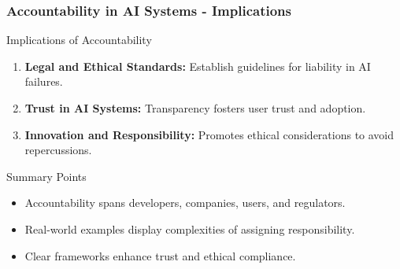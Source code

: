 \documentclass[aspectratio=169]{beamer}
\begin{document}
\begin{frame}[fragile]
    \frametitle{Accountability in AI Systems - Implications}
    \begin{block}{Implications of Accountability}
        \begin{enumerate}
            \item \textbf{Legal and Ethical Standards:} Establish guidelines for liability in AI failures.
            \item \textbf{Trust in AI Systems:} Transparency fosters user trust and adoption.
            \item \textbf{Innovation and Responsibility:} Promotes ethical considerations to avoid repercussions.
        \end{enumerate}
    \end{block}
    
    \begin{block}{Summary Points}
        \begin{itemize}
            \item Accountability spans developers, companies, users, and regulators.
            \item Real-world examples display complexities of assigning responsibility.
            \item Clear frameworks enhance trust and ethical compliance.
        \end{itemize}
    \end{block}
\end{frame}
\end{document}
